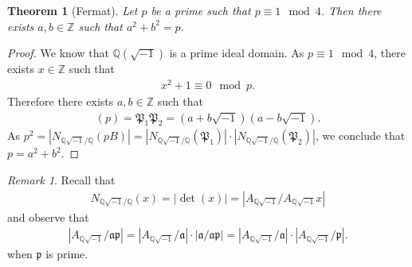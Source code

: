 \documentclass[12pt]{article}
\theoremstyle{plain}
\newtheorem{theorem}{Theorem}[section]
\theoremstyle{remark}
\newtheorem*{remark}{Remark}
\theoremstyle{definition}
\newcommand{\Z}{\mathbb{Z}}
\newcommand{\Q}{\mathbb{Q}}
\begin{document}
\begin{theorem}[Fermat]
    Let $p$ be a prime such that $p\equiv 1\mod 4$. Then there exists $a,b\in\Z$ such that $a^2+b^2=p$.
\end{theorem}
\begin{proof}
    We know that $\Q(\sqrt{-1})$ is a prime ideal domain. As $p\equiv 1\mod 4$, there exists $x\in\Z$ such that
    \begin{align*}
        x^2+1\equiv 0\mod p.
    \end{align*}
    Therefore there exists $a,b\in\Z$ such that
    \begin{align*}
        (p) = \mathfrak{P}_1\mathfrak{P}_2 = (a+b\sqrt{-1})(a-b\sqrt{-1}).
    \end{align*}
    As $p^2=|N_{\Q\sqrt{-1}/\Q}(pB)|=|N_{\Q\sqrt{-1}/\Q}(\mathfrak{P}_1)|\cdot|N_{\Q\sqrt{-1}/\Q}(\mathfrak{P}_2)|$, we conclude that $p=a^2+b^2$.
\end{proof}
\begin{remark}
    Recall that
    \begin{align*}
        N_{\Q\sqrt{-1}/\Q}(x)=|\det(x)|=|A_{\Q\sqrt{-1}}/A_{\Q\sqrt{-1}}x|
    \end{align*}
    and observe that
    \begin{align*}
        |A_{\Q\sqrt{-1}}/\mathfrak{ap}|=|A_{\Q\sqrt{-1}}/\mathfrak{a}|\cdot|\mathfrak{a}/\mathfrak{ap}|=|A_{\Q\sqrt{-1}}/\mathfrak{a}|\cdot|A_{\Q\sqrt{-1}}/\mathfrak{p}|.
    \end{align*}
    when $\mathfrak{p}$ is prime.
\end{remark}
\end{document}

